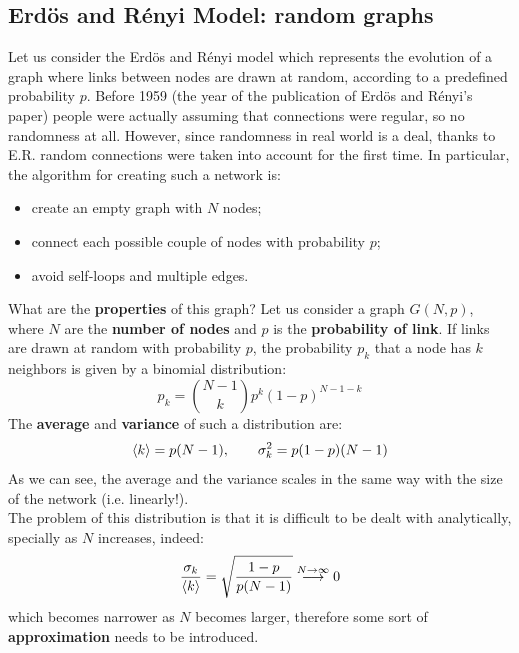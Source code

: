 \documentclass[../main/main.tex]{subfiles}
\begin{document}
\subsection{Erdös and Rényi Model: random graphs}
Let us consider the Erdös and Rényi model which represents the evolution of a graph where links between nodes are drawn at random, according to a predefined probability $p$. Before 1959 (the year of the publication of Erdös and Rényi's paper) people were actually assuming that connections were regular, so no randomness at all. However, since randomness in real world is a deal, thanks to E.R. random connections were taken into account for the first time.
In particular, the algorithm for creating such a network is:
\begin{itemize}
\item create an empty graph with $N$ nodes;
\item connect each possible couple of nodes with probability $p$;
\item avoid self-loops and multiple edges.
\end{itemize}
What are the \textbf{properties} of this graph?
Let us consider a graph \( G(N,p) \), where \( N \) are the \textbf{number of nodes} and \( p \) is the \textbf{probability of link}.
If links are drawn at random with probability $p$, the probability $p_k$ that a node has $k$ neighbors is given by a binomial distribution:
\begin{equation}
  p_k = \binom{N-1}{k} p^k (1-p)^{N-1-k}
\end{equation}
The \textbf{average} and \textbf{variance} of such a distribution are:
\begin{equation}
  \expval{k} = p(N-1), \qquad \sigma _k^2 = p(1-p)(N-1)
\end{equation}
As we can see, the average and the variance scales in the same way with the size of the network (i.e. linearly!).\\
The problem of this distribution is that it is difficult to be dealt with analytically, specially as \( N \) increases, indeed:
\begin{equation*}
  \frac{\sigma _k}{\expval{k} } = \sqrt{\frac{1-p}{p(N-1)}} \overset{N \rightarrow \infty }{\longrightarrow } 0
\end{equation*}
which becomes narrower as \( N \) becomes larger, therefore some sort of \textbf{approximation} needs to be introduced.
\end{document}
